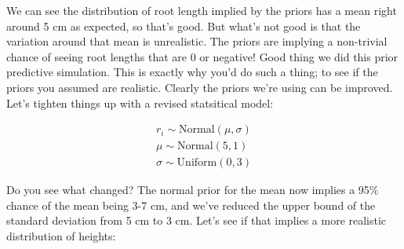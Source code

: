 \documentclass[
]{book}
\begin{document}
We can see the distribution of root length implied by the priors has a mean right around 5 cm as expected, so that's good. But what's not good is that the variation around that mean is unrealistic. The priors are implying a non-trivial chance of seeing root lengths that are 0 or negative! Good thing we did this prior predictive simulation. This is exactly why you'd do such a thing; to see if the priors you assumed are realistic. Clearly the priors we're using can be improved. Let's tighten things up with a revised statsitical model:

\[
\begin{array}{l}
r_i \sim \mathrm{Normal}(\mu, \sigma) \\
\mu \sim \mathrm{Normal}(5, 1) \\
\sigma \sim \mathrm{Uniform}(0, 3)
\end{array}
\]

Do you see what changed? The normal prior for the mean now implies a 95\% chance of the mean being 3-7 cm, and we've reduced the upper bound of the standard deviation from 5 cm to 3 cm. Let's see if that implies a more realistic distribution of heights:
\end{document}
